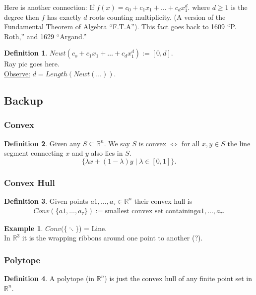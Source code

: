 \documentclass[]{article}
\theoremstyle{definition}
\newtheorem*{defn}{Definition}
\newtheorem{ex}{Example}[section]
\begin{document}
			Here is another connection: If $f(x)=c_0+c_1x_1+\ldots+c_dx_1^d.$ where $d\geq1$ is the degree then $f$ has exactly $d$ roots counting multiplicity. (A version of the Fundamental Theorem of Algebra ``F.T.A'').
			This fact goes back to 1609 ``P. Roth,'' and 1629 ``Argand.''
			\begin{defn}
			$Newt(c_o+c_1x_1+\ldots+c_dx_1^{d}):= [0,d].$
			\\
			Ray pic goes here.\\
			
			\underline{Observe:} $d=Length(Newt(\ldots))$.
			\end{defn}
			\subsection{Backup}
			\subsubsection{Convex}
			\begin{defn}
			Given any $S \subseteq \mathbb{R}^n$. We say $S$ is convex $\iff$ for all $x,y \in S$ the line segment connecting $x$ and $y$ also lies in $S$.
			\[ \{ \lambda x + (1-\lambda)y \mid \lambda \in [0,1]\}.\]
			\end{defn}
			\subsubsection{Convex Hull}
			\begin{defn}
			Given points $a1,\ldots,a_\tau \in \mathbb{R}^n$ their convex hull is
			\begin{align*}
			Conv(\{a1,\ldots,a_\tau\}):= \text{smallest convex set containing} a1,\ldots,a_\tau.
			\end{align*} 
			\end{defn}
			\begin{ex}
			$Conv(\{\ddots\}$) = Line.\\
			In $\mathbb{R}^3$ it is the wrapping ribbons around one point to another (?).
			\end{ex}
			\subsubsection{Polytope}
			\begin{defn}
			A polytope (in $\mathbb{R}^n$) is just the convex hull of any finite point set in $\mathbb{R}^n$.
			\end{defn}
\end{document}
